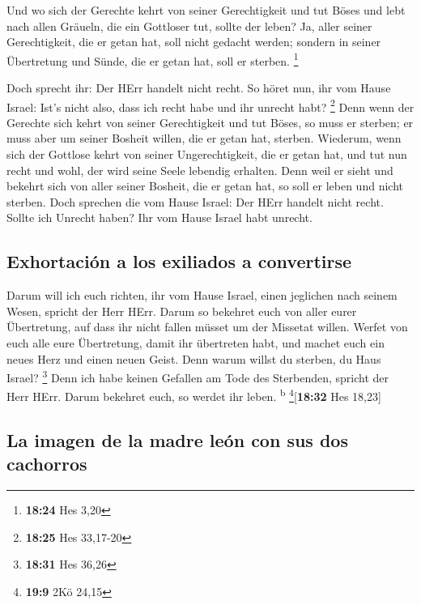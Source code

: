  Und wo sich der Gerechte kehrt von seiner Gerechtigkeit
und tut Böses und lebt nach allen Gräueln, die ein Gottloser tut, sollte
der leben? Ja, aller seiner Gerechtigkeit, die er getan hat, soll nicht
gedacht werden; sondern in seiner Übertretung und Sünde, die er getan
hat, soll er sterben. \footnote{\textbf{18:24} Hes 3,20}

 Doch sprecht ihr: Der HErr handelt nicht recht. So höret
nun, ihr vom Hause Israel: Ist's nicht also, dass ich recht habe und ihr
unrecht habt? \footnote{\textbf{18:25} Hes 33,17-20} 
Denn wenn der Gerechte sich kehrt von seiner Gerechtigkeit und tut
Böses, so muss er sterben; er muss aber um seiner Bosheit willen, die er
getan hat, sterben.  Wiederum, wenn sich der Gottlose
kehrt von seiner Ungerechtigkeit, die er getan hat, und tut nun recht
und wohl, der wird seine Seele lebendig erhalten.  Denn
weil er sieht und bekehrt sich von aller seiner Bosheit, die er getan
hat, so soll er leben und nicht sterben.  Doch sprechen
die vom Hause Israel: Der HErr handelt nicht recht. Sollte ich Unrecht
haben? Ihr vom Hause Israel habt unrecht.

\hypertarget{exhortaciuxf3n-a-los-exiliados-a-convertirse}{%
\subsection{Exhortación a los exiliados a
convertirse}\label{exhortaciuxf3n-a-los-exiliados-a-convertirse}}

 Darum will ich euch richten, ihr vom Hause Israel, einen
jeglichen nach seinem Wesen, spricht der Herr HErr. Darum so bekehret
euch von aller eurer Übertretung, auf dass ihr nicht fallen müsset um
der Missetat willen.  Werfet von euch alle eure
Übertretung, damit ihr übertreten habt, und machet euch ein neues Herz
und einen neuen Geist. Denn warum willst du sterben, du Haus Israel?
\footnote{\textbf{18:31} Hes 36,26}  Denn ich habe keinen
Gefallen am Tode des Sterbenden, spricht der Herr HErr. Darum bekehret
euch, so werdet ihr leben. \textsuperscript{b}
\footnote{\textbf{19:9} 2Kö 24,15}{[}\textbf{18:32} Hes 18,23{]}

\hypertarget{la-imagen-de-la-madre-leuxf3n-con-sus-dos-cachorros}{%
\subsection{La imagen de la madre león con sus dos
cachorros}\label{la-imagen-de-la-madre-leuxf3n-con-sus-dos-cachorros}}

